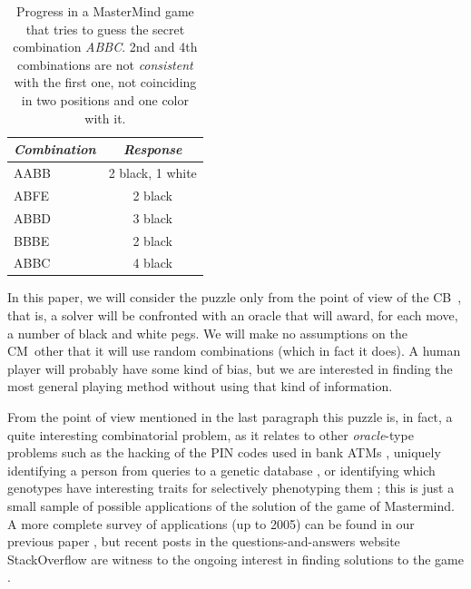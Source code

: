 \documentclass[preprint,12pt]{elsarticle}
\def\codemaker{CM}
\def\codebreaker{CB}
\begin{document}
%
\begin{table}[t]
\caption{Progress in a MasterMind game that tries to guess the secret
  combination {\em ABBC}. 2nd and 4th combinations are not {\em
    consistent} with the  
  first one, not coinciding in two positions and one color
  with it. \label{tab:mm}}
  \centering\smallskip
\begin{tabular}{|l|c|}
\hline
\emph{Combination} & \emph{Response} \\
\hline
AABB & 2 black, 1 white\\
ABFE & 2 black\\
ABBD & 3 black\\
BBBE & 2 black \\
ABBC & 4 black\\
\hline
\end{tabular}
\end{table}
%
In this paper, we will consider the puzzle only from the point of view
of the \codebreaker\ , that is, a solver will be confronted with an
oracle that will award, for each move, a number of black and white
pegs. We will make no assumptions on the \codemaker\ other that it
will use random combinations (which in fact it does). A human player will probably have some
kind of bias, but we are interested in finding the most general
playing method
without using that kind of information. 

From the point of view mentioned in the last paragraph this puzzle is, in fact, a quite interesting combinatorial problem,
as it relates to other {\em oracle}-type problems such as the
 hacking of the PIN codes used in bank ATMs
 \cite{bank:mm,focardi2011guessing},  uniquely identifying a person
 from queries to a genetic database \cite{goodrich2009algorithmic}, or
 identifying which genotypes have interesting traits for selectively
 phenotyping them \cite{gagneur2011selective}; this is just a small
 sample of possible applications of the solution of the game of
 Mastermind. A more complete survey of applications (up to 2005) can
 be found in our previous paper \cite{mastermind05}, but recent posts
 in the questions-and-answers website StackOverflow are witness to the
 ongoing interest in finding solutions to the game
 \cite{stackoverflow}. 
\end{document}
